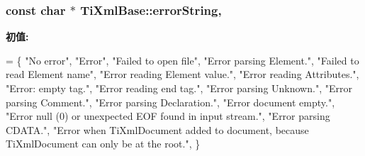 \subsubsection[{\texorpdfstring{error\+String}{errorString}}]{\setlength{\rightskip}{0pt plus 5cm}const char $\ast$ Ti\+Xml\+Base\+::error\+String\hspace{0.3cm}{\ttfamily [static]}, {\ttfamily [protected]}}\hypertarget{class_ti_xml_base_a7ac8feec4100e446b3d78e1ac0659700}{}\label{class_ti_xml_base_a7ac8feec4100e446b3d78e1ac0659700}
{\bfseries 初值\+:}
\begin{DoxyCode}
=
\{
    \textcolor{stringliteral}{"No error"},
    \textcolor{stringliteral}{"Error"},
    \textcolor{stringliteral}{"Failed to open file"},
    \textcolor{stringliteral}{"Error parsing Element."},
    \textcolor{stringliteral}{"Failed to read Element name"},
    \textcolor{stringliteral}{"Error reading Element value."},
    \textcolor{stringliteral}{"Error reading Attributes."},
    \textcolor{stringliteral}{"Error: empty tag."},
    \textcolor{stringliteral}{"Error reading end tag."},
    \textcolor{stringliteral}{"Error parsing Unknown."},
    \textcolor{stringliteral}{"Error parsing Comment."},
    \textcolor{stringliteral}{"Error parsing Declaration."},
    \textcolor{stringliteral}{"Error document empty."},
    \textcolor{stringliteral}{"Error null (0) or unexpected EOF found in input stream."},
    \textcolor{stringliteral}{"Error parsing CDATA."},
    \textcolor{stringliteral}{"Error when TiXmlDocument added to document, because TiXmlDocument can only be at the root."},
\}
\end{DoxyCode}
